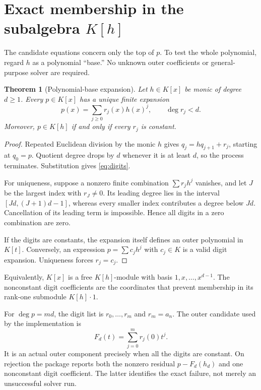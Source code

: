\documentclass[11pt,a4paper]{article}
\numberwithin{equation}{section}
\newtheorem{theorem}{Theorem}[section]
\theoremstyle{definition}
\theoremstyle{remark}
\begin{document}
\section{Exact membership in the subalgebra \texorpdfstring{$K[h]$}{K[h]}}
\label{sec:digits}
The candidate equations concern only the top of $p$. To test the whole
polynomial, regard $h$ as a polynomial ``base.'' No unknown outer coefficients
or general-purpose solver are required.

\begin{theorem}[Polynomial-base expansion]
\label{thm:digits}
Let $h\in K[x]$ be monic of degree $d\ge1$. Every $p\in K[x]$ has a unique
finite expansion
\begin{equation}
 p(x)=\sum_{j\ge0}r_j(x)h(x)^j,\qquad \deg r_j<d.
 \label{eq:digits}
\end{equation}
Moreover, $p\in K[h]$ if and only if every $r_j$ is constant.
\end{theorem}
\begin{proof}
Repeated Euclidean division by the monic $h$ gives
$q_j=hq_{j+1}+r_j$, starting at $q_0=p$. Quotient degree drops by $d$ whenever
it is at least $d$, so the process terminates. Substitution gives
\eqref{eq:digits}.

For uniqueness, suppose a nonzero finite combination
$\sum r_jh^j$ vanishes, and let $J$ be the largest index with $r_J\ne0$.
Its leading degree lies in the interval $[Jd,(J+1)d-1]$, whereas every smaller
index contributes a degree below $Jd$. Cancellation of its leading term is
impossible. Hence all digits in a zero combination are zero.

If the digits are constants, the expansion itself defines an outer polynomial
in $K[t]$. Conversely, an expression $p=\sum c_jh^j$ with $c_j\in K$ is a
valid digit expansion. Uniqueness forces $r_j=c_j$.
\end{proof}

Equivalently, $K[x]$ is a free $K[h]$-module with basis
$1,x,\ldots,x^{d-1}$. The nonconstant digit coefficients are the coordinates
that prevent membership in its rank-one submodule $K[h]\cdot1$.

For $\deg p=md$, the digit list is $r_0,\ldots,r_m$ and $r_m=a_n$.
The outer candidate used by the implementation is
\begin{equation}
 F_d(t)=\sum_{j=0}^{m}r_j(0)t^j.
 \label{eq:outercandidate}
\end{equation}
It is an actual outer component precisely when all the digits are constant.
On rejection the package reports both the nonzero residual $p-F_d(h_d)$ and
one nonconstant digit coefficient. The latter identifies the exact failure,
not merely an unsuccessful solver run.
\end{document}
